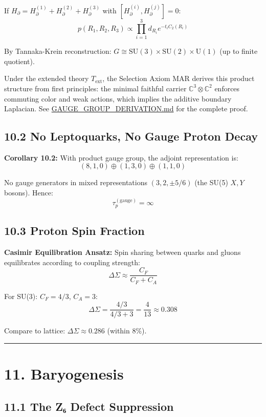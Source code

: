 If \(H_\partial = H_\partial^{(1)} + H_\partial^{(2)} + H_\partial^{(3)}\) with \([H_\partial^{(i)}, H_\partial^{(j)}] = 0\): \[p(R_1, R_2, R_3) \propto \prod_{i=1}^3 d_{R_i} e^{-t_i C_2(R_i)}\]

By Tannaka-Krein reconstruction: \(G \cong \text{SU}(3) \times \text{SU}(2) \times \text{U}(1)\) (up to finite quotient).

Under the extended theory \(T_{\mathrm{ext}}\), the Selection Axiom MAR derives this product structure from first principles: the minimal faithful carrier \(\mathbb{C}^3 \otimes \mathbb{C}^2\) enforces commuting color and weak actions, which implies the additive boundary Laplacian. See \url{GAUGE_GROUP_DERIVATION.md} for the complete proof.

\subsection{10.2 No Leptoquarks, No Gauge Proton Decay}\label{102-no-leptoquarks-no-gauge-proton-decay}

\textbf{Corollary 10.2:} With product gauge group, the adjoint representation is: \[(8,1,0) \oplus (1,3,0) \oplus (1,1,0)\]

No gauge generators in mixed representations \((3,2,\pm 5/6)\) (the SU(5) \(X,Y\) bosons). Hence: \[\tau_p^{(\text{gauge})} = \infty\]

\subsection{10.3 Proton Spin Fraction}\label{103-proton-spin-fraction}

\textbf{Casimir Equilibration Ansatz:} Spin sharing between quarks and gluons equilibrates according to coupling strength: \[\Delta\Sigma \approx \frac{C_F}{C_F + C_A}\]

For SU(3): \(C_F = 4/3\), \(C_A = 3\): \[\Delta\Sigma = \frac{4/3}{4/3 + 3} = \frac{4}{13} \approx 0.308\]

Compare to lattice: \(\Delta\Sigma \approx 0.286\) (within 8\%).

\begin{center}\rule{0.5\linewidth}{0.5pt}\end{center}

\section{11. Baryogenesis}\label{11-baryogenesis}

\subsection{11.1 The Z₆ Defect Suppression}\label{111-the-zux2086-defect-suppression}

